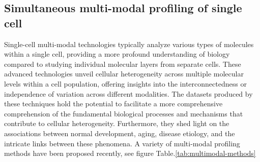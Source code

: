 \subsection{Simultaneous multi-modal profiling of single cell}
Single-cell multi-modal technologies typically analyze various types of molecules within a single cell, providing a more profound understanding of biology compared to studying individual molecular layers from separate cells. These advanced technologies unveil cellular heterogeneity across multiple molecular levels within a cell population, offering insights into the interconnectedness or independence of variation across different modalities. The datasets produced by these techniques hold the potential to facilitate a more comprehensive comprehension of the fundamental biological processes and mechanisms that contribute to cellular heterogeneity. Furthermore, they shed light on the associations between normal development, aging, disease etiology, and the intricate links between these phenomena. A variety of multi-modal profiling methods have been proposed recently, see figure Table.\ref{tab:multimodal-methods}

